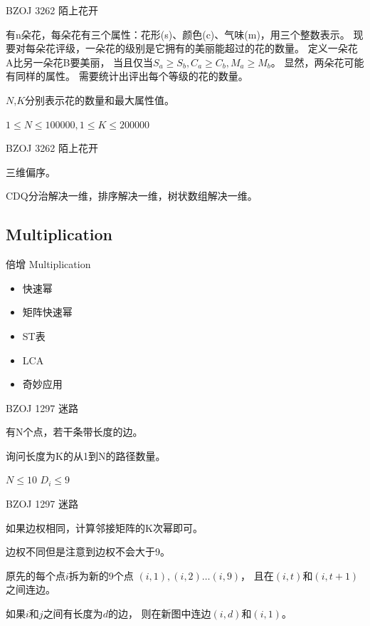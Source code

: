 \documentclass{beamer}
\begin{document}
\begin{frame}{BZOJ 3262 陌上花开}
    
    有n朵花，每朵花有三个属性：花形(s)、颜色(c)、气味(m)，用三个整数表示。
    现要对每朵花评级，一朵花的级别是它拥有的美丽能超过的花的数量。
    定义一朵花A比另一朵花B要美丽，
    当且仅当$S_a \geq S_b,C_a \geq C_b,M_a\geq M_b$。
    显然，两朵花可能有同样的属性。
    需要统计出评出每个等级的花的数量。

    $N$,$K$分别表示花的数量和最大属性值。

    $1 \leq N \leq 100000, 1 \leq K \leq 200000$

\end{frame}

\begin{frame}{BZOJ 3262 陌上花开}
    
    三维偏序。

    CDQ分治解决一维，排序解决一维，树状数组解决一维。

\end{frame}

\subsection{Multiplication}

\begin{frame}{倍增 Multiplication}

    \begin{itemize}
        \item 快速幂
        \item 矩阵快速幂
        \item ST表
        \item LCA
        \item 奇妙应用
    \end{itemize}
    
\end{frame}

\begin{frame}{BZOJ 1297 迷路}

    有N个点，若干条带长度的边。

    询问长度为K的从1到N的路径数量。

    $N\leq 10$
    $D_i\leq 9$
    
\end{frame}

\begin{frame}{BZOJ 1297 迷路}

    如果边权相同，计算邻接矩阵的K次幂即可。

    边权不同但是注意到边权不会大于9。

    原先的每个点$i$拆为新的9个点
    $(i,1),(i,2)\ldots(i,9)$，
    且在$(i,t)$和$(i,t+1)$之间连边。

    如果$i$和$j$之间有长度为$d$的边，
    则在新图中连边$(i,d)$和$(i,1)$。
    
\end{frame}
\end{document}
